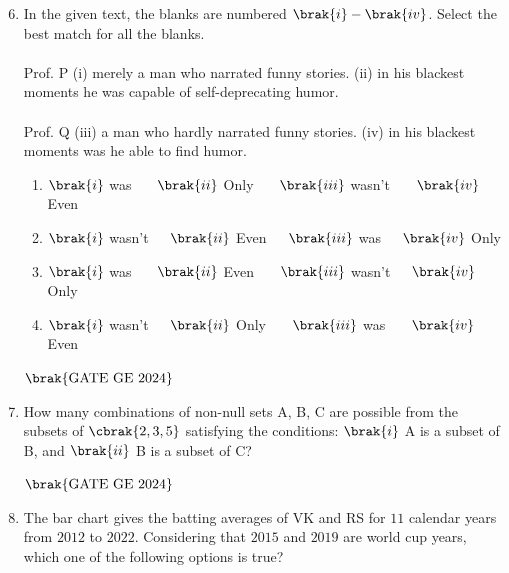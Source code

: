 \documentclass[journal,12pt,onecolumn]{IEEEtran}
\theoremstyle{remark}
\begin{document}
\begin{enumerate}
\setcounter{enumi}{5}
\item In the given text, the blanks are numbered $\brak{i}-\brak{iv}$.
Select the best match for all the blanks. \\
\\Prof. P \underline{\hspace{1cm}} (i) \underline{\hspace{1cm}} merely a man who narrated funny stories.
\underline{\hspace{1cm}} (ii) \underline{\hspace{1cm}} in his blackest moments he was capable of self-deprecating humor. \\
\\Prof.
Q \underline{\hspace{1cm}} (iii) \underline{\hspace{1cm}} a man who hardly narrated funny stories.
\underline{\hspace{1cm}} (iv) \underline{\hspace{1cm}} in his blackest moments was he able to find humor.
\begin{enumerate}
\item $\brak{i}$ was \ \ \ $\brak{ii}$ Only \ \ \   $\brak{iii}$ wasn't \ \ \ $\brak{iv}$ Even
\item $\brak{i}$ wasn't\ \ \  $\brak{ii}$ Even\ \ \  $\brak{iii}$ was\ \ \  $\brak{iv}$ Only
\item $\brak{i}$ was \ \ \ $\brak{ii}$ Even \ \ \ $\brak{iii}$ wasn't\ \ \  $\brak{iv}$ Only
\item $\brak{i}$ wasn't\ \ \  $\brak{ii}$ Only \ \ \ $\brak{iii}$ was \ \ \ $\brak{iv}$ Even
\end{enumerate}
\hfill $\brak{\text{GATE GE 2024}}$
\bigskip
\item How many combinations of non-null sets A, B, C are possible from the subsets of $\cbrak{2,3,5}$ satisfying the conditions: $\brak{i}$ A is a subset of B, and 
$\brak{ii}$ B is a subset of C?
\begin{enumerate}
\end{enumerate}
\hfill $\brak{\text{GATE GE 2024}}$
\bigskip
\item The bar chart gives the batting averages of VK and RS for $11$ calendar years from $2012$ to $2022$. Considering that $2015$ and $2019$ are world cup years, which one of the following options is true?\\

\end{enumerate}
\end{document}
